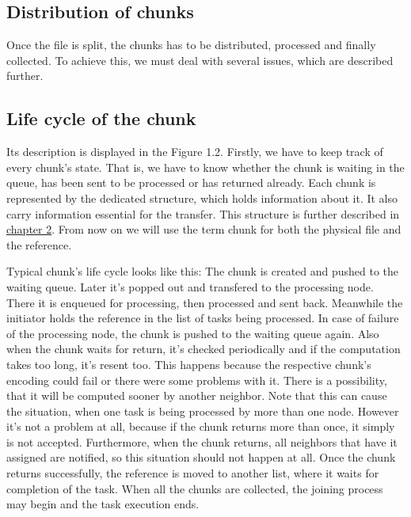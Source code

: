 \subsection{Distribution of chunks}\label{distribution-of-chunks}

Once the file is split, the chunks has to be distributed, processed and
finally collected. To achieve this, we must deal with several issues,
which are described further.

\subsection*{Life cycle of the chunk}

Its description is displayed in the Figure 1.2. Firstly, we have to keep
track of every chunk's state. That is, we have to know whether the chunk
is waiting in the queue, has been sent to be processed or has returned
already. Each chunk is represented by the dedicated structure, which
holds information about it. It also carry information essential for the
transfer. This structure is further described in
\hyperref[implementation]{chapter 2}. From now on we will use the term
chunk for both the physical file and the reference.

Typical chunk's life cycle looks like this: The chunk is created and
pushed to the waiting queue. Later it's popped out and transfered to the
processing node. There it is enqueued for processing, then processed and
sent back. Meanwhile the initiator holds the reference in the list of
tasks being processed. In case of failure of the processing node, the
chunk is pushed to the waiting queue again. Also when the chunk waits
for return, it's checked periodically and if the computation takes too
long, it's resent too. This happens because the respective chunk's
encoding could fail or there were some problems with it. There is a
possibility, that it will be computed sooner by another neighbor. Note
that this can cause the situation, when one task is being processed by
more than one node. However it's not a problem at all, because if the
chunk returns more than once, it simply is not accepted. Furthermore,
when the chunk returns, all neighbors that have it assigned are
notified, so this situation should not happen at all. Once the chunk
returns successfully, the reference is moved to another list, where it
waits for completion of the task. When all the chunks are collected, the
joining process may begin and the task execution ends.

